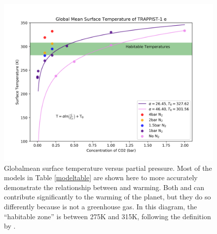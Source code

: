 \begin{figure}[htbp]
    \begin{center}
        \includegraphics[width=\textwidth]{models/surfacet_co2.png}
        \caption[Globalmean Surface Temperatures Versus  Partial
        Pressure]{Globalmean surface temperature versus  partial
        pressure. Most of the models in Table \ref{modeltable} are shown here to
        more accurately demonstrate the relationship between  and
        warming. Both  and  can contribute significantly to
        the warming of the planet, but they do so differently because 
        is not a greenhouse gas. In this diagram, the ``habitable zone'' is
        between 275K and 315K, following the definition by \citet{wolf17}.}
        \label{modelco2plot}
    \end{center}
\end{figure}

